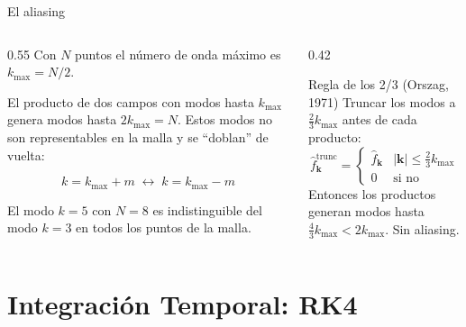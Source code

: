 \documentclass[aspectratio=169, 12pt]{beamer}
\begin{document}
\begin{frame}{El aliasing}
  \begin{columns}
    \begin{column}{0.55\textwidth}
      Con $N$ puntos el número de onda máximo es $k_{\max} = N/2$.

      \vspace{0.5em}
      El producto de dos campos con modos hasta $k_{\max}$ genera
      modos hasta $2k_{\max} = N$. Estos modos no son
      representables en la malla y se ``doblan'' de vuelta:

      \[
        k = k_{\max} + m \;\longleftrightarrow\; k = k_{\max} - m
      \]

      El modo $k=5$ con $N=8$ es indistinguible del modo $k=3$
      en todos los puntos de la malla.
    \end{column}
    \begin{column}{0.42\textwidth}
      \begin{block}{Regla de los 2/3 (Orszag, 1971)}
        Truncar los modos a $\frac{2}{3}k_{\max}$ antes de
        cada producto:
        \[
          \hat{f}_\mathbf{k}^{\text{trunc}} =
          \begin{cases}
            \hat{f}_\mathbf{k} & |\mathbf{k}| \leq \tfrac{2}{3}k_{\max}\\
            0 & \text{si no}
          \end{cases}
        \]
        Entonces los productos generan modos hasta
        $\frac{4}{3}k_{\max} < 2k_{\max}$. Sin aliasing.
      \end{block}
    \end{column}
  \end{columns}
\end{frame}


\section{Integración Temporal: RK4}
\end{document}
